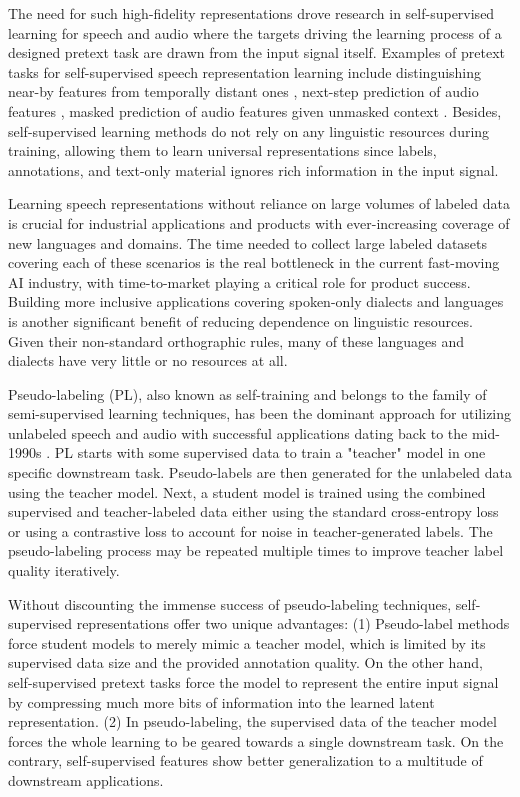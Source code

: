 The need for such high-fidelity representations drove research in self-supervised learning for speech and audio where the targets driving the learning process of a designed pretext task are drawn from the input signal itself. Examples of pretext tasks for self-supervised speech representation learning include distinguishing near-by features from temporally distant ones \cite{oord2018representation,schneider2019wav2vec,kharitonov2020data}, next-step prediction of audio features \cite{chung2019unsupervised}, masked prediction of audio features given unmasked context \cite{baevski2019vq,baevski2020wav2vec}. Besides, self-supervised learning methods do not rely on any linguistic resources during training, allowing them to learn universal representations since labels, annotations, and text-only material ignores rich information in the input signal.

Learning speech representations without reliance on large volumes of labeled data is crucial for industrial applications and products with ever-increasing coverage of new languages and domains. The time needed to collect large labeled datasets covering each of these scenarios is the real bottleneck in the current fast-moving AI industry, with time-to-market playing a critical role for product success. Building more inclusive applications covering spoken-only dialects and languages is another significant benefit of reducing dependence on linguistic resources. Given their non-standard orthographic rules, many of these languages and dialects have very little or no resources at all.

Pseudo-labeling (PL), also known as self-training and belongs to the family of semi-supervised learning techniques, has been the dominant approach for utilizing unlabeled speech and audio with successful applications dating back to the mid-1990s \cite{Zavaliagkos_98, ma_bbn_06, kahn2020self, hsu2020semi}. PL starts with some supervised data to train a "teacher" model in one specific downstream task. Pseudo-labels are then generated for the unlabeled data using the teacher model. Next, a student model is trained using the combined supervised and teacher-labeled data either using the standard cross-entropy \cite{kahn2020self} loss or using a contrastive loss \cite{xiao2021contrastive} to account for noise in teacher-generated labels. The pseudo-labeling process may be repeated multiple times to improve teacher label quality \cite{xu2020iterative} iteratively.

Without discounting the immense success of pseudo-labeling techniques, self-supervised representations offer two unique advantages: (1) Pseudo-label methods force student models to merely mimic a teacher model, which is limited by its supervised data size and the provided annotation quality. On the other hand, self-supervised pretext tasks force the model to represent the entire input signal by compressing much more bits of information into the learned latent representation. (2) In pseudo-labeling, the supervised data of the teacher model forces the whole learning to be geared towards a single downstream task. On the contrary, self-supervised features show better generalization to a multitude of downstream applications.


